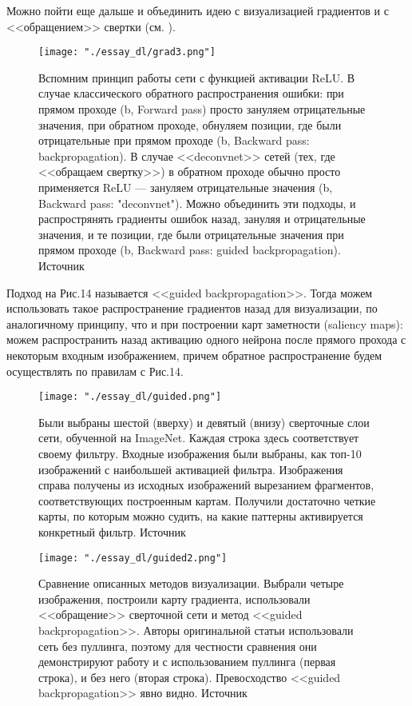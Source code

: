 \documentclass[12pt,fleqn]{article}
\begin{document}
Можно пойти еще дальше и объединить идею с визуализацией градиентов и с <<обращением>> свертки (см. \cite{ImageNet}).

\begin{figure}[H]
\centering
\texttt{[image: "./essay\_dl/grad3.png"]}
\caption{Вспомним принцип работы сети с функцией активации ReLU. В случае классического обратного распространения ошибки: при прямом проходе (b, Forward pass) просто зануляем отрицательные значения, при обратном проходе, обнуляем позиции, где были отрицательные при прямом проходе (b, Backward pass: backpropagation). В случае <<deconvnet>> сетей (тех, где <<обращаем свертку>>) в обратном проходе обычно просто применяется ReLU --- зануляем отрицательные значения (b, Backward pass: "deconvnet"). Можно объединить эти подходы, и распрострянять градиенты ошибок назад, зануляя и отрицательные значения, и те позиции, где были отрицательные значения при прямом проходе (b, Backward pass: guided backpropagation). Источник \cite{ImageNet}}
\end{figure} 

Подход на Рис.14 называется <<guided backpropagation>>. Тогда можем использовать такое распространение градиентов назад для визуализации, по аналогичному принципу, что и при построении карт заметности (saliency maps): можем распространить назад активацию одного нейрона после прямого прохода с некоторым входным изображением, причем обратное распространение будем осуществлять по правилам с Рис.14.
\begin{figure}[H]
\centering
\texttt{[image: "./essay\_dl/guided.png"]}
\caption{Были выбраны шестой (вверху) и девятый (внизу) сверточные слои сети, обученной на ImageNet. Каждая строка здесь соответствует своему фильтру. Входные изображения были выбраны, как топ-10 изображений с наибольшей активацией фильтра. Изображения справа получены из исходных изображений вырезанием фрагментов, соответствующих построенным картам. Получили достаточно четкие карты, по которым можно судить, на какие паттерны активируется конкретный фильтр. Источник \cite{ImageNet}}
\end{figure}
\begin{figure}[H]
\centering
\texttt{[image: "./essay\_dl/guided2.png"]}
\caption{Сравнение описанных методов визуализации. Выбрали четыре изображения, построили карту градиента, использовали <<обращение>> сверточной сети и метод <<guided backpropagation>>. Авторы оригинальной статьи использовали сеть без пуллинга, поэтому для честности сравнения они демонстрируют работу и с использованием пуллинга (первая строка), и без него (вторая строка). Превосходство <<guided backpropagation>> явно видно. Источник \cite{ImageNet}}
\end{figure}
\end{document}
